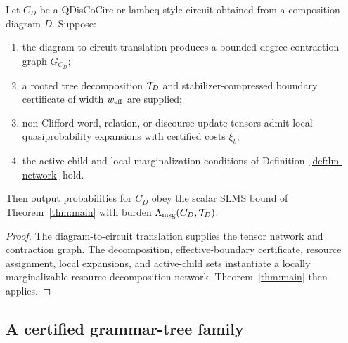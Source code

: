 \begin{proposition}
\label{prop:qdiscocirc-specialization}
Let \(C_D\) be a QDisCoCirc or lambeq-style circuit obtained from a composition diagram \(D\). Suppose:
\begin{enumerate}[leftmargin=1.2cm]
\item the diagram-to-circuit translation produces a bounded-degree contraction graph \(G_{C_D}\);
\item a rooted tree decomposition \(\mathcal{T}_D\) and stabilizer-compressed boundary certificate of width \(w_{\mathrm{eff}}\) are supplied;
\item non-Clifford word, relation, or discourse-update tensors admit local quasiprobability expansions with certified costs \(\xi_b\);
\item the active-child and local marginalization conditions of Definition~\ref{def:lm-network} hold.
\end{enumerate}
Then output probabilities for \(C_D\) obey the scalar SLMS bound of Theorem~\ref{thm:main} with burden \(\Lambda_{\mathrm{msg}}(C_D,\mathcal{T}_D)\).
\end{proposition}

\begin{proof}
The diagram-to-circuit translation supplies the tensor network and contraction graph. The decomposition, effective-boundary certificate, resource assignment, local expansions, and active-child sets instantiate a locally marginalizable resource-decomposition network. Theorem~\ref{thm:main} then applies.
\end{proof}

\subsection{A certified grammar-tree family}

